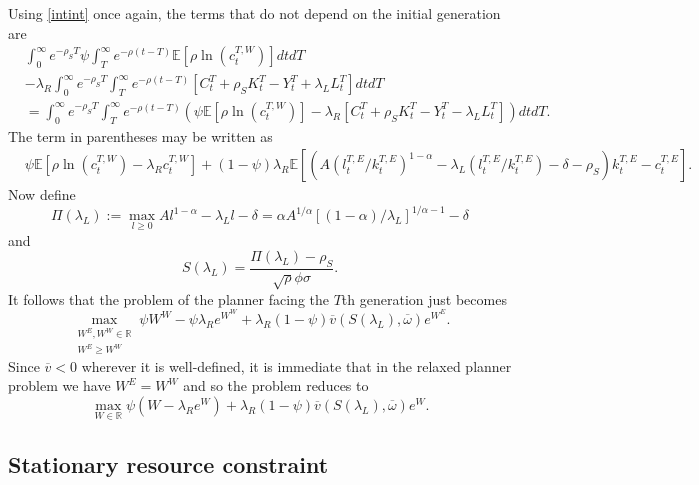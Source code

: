 \documentclass[11pt]{article}
\theoremstyle{plain}
\theoremstyle{definition} %
\begin{document}
Using \eqref{intint} once again, the terms that do not depend on the initial generation are 
\begin{align*}
 & \int_0^{\infty}e^{-\rho_ST} \psi \int_T^{\infty}e^{-\rho (t-T)} \mathbb{E} [\rho \ln(c^{T,W}_t)]dt dT
\\ & - \lambda_R \int_0^{\infty} e^{-\rho_ST}\int_T^{\infty} e^{-\rho (t-T)} [C^T_t + \rho_SK^T_t - Y^T_t + \lambda_LL^T_t]dtdT
\\ & = \int_0^{\infty} e^{-\rho_ST}\int_T^{\infty}e^{-\rho (t-T)} {\left(\psi\mathbb{E} [\rho\ln(c^{T,W}_t)] - \lambda_R[C^T_t + \rho_SK^T_t - Y^T_t - \lambda_LL^T_t]\right)}dt dT .
\end{align*}
The term in parentheses may be written as 
\begin{align*}
 & \psi\mathbb{E} {\left[\rho\ln(c^{T,W}_t) - \lambda_R c^{T,W}_t\right]} + (1-\psi) \lambda_R \mathbb{E}{\left[{\left(A(l^{T,E}_t/k^{T,E}_t)^{1-\alpha} - \lambda_L(l^{T,E}_t/k^{T,E}_t) - \delta - \rho_S\right)}k^{T,E}_t - c^{T,E}_t\right]}.
\end{align*}
Now define 
\begin{equation}
\Pi(\lambda_L) := \max_{l\geq 0} A l^{1-\alpha} - \lambda_Ll - \delta = \alpha A^{1/\alpha} [(1-\alpha)/\lambda_L]^{1/\alpha-1} - \delta
\label{PilambdaL}
\end{equation}
and 
\begin{equation}
S(\lambda_L) = \frac{\Pi(\lambda_L) - \rho_S}{\sqrt{\rho}\phi \sigma}. %
\label{GER}
\end{equation}
It follows that the problem of the planner facing the $T$th generation just becomes 
\begin{equation}
\max_{\substack{W^E, W^W \in \mathbb{R} \\ W^E \geq W^W}} \psi W^W - \psi \lambda_R e^{W^W} + \lambda_R(1-\psi)\overline{v}(S(\lambda_L), \overline{\omega})e^{W^E}. 
\label{Tgen}
\end{equation}
Since $\overline{v}<0$ wherever it is well-defined, it is immediate that in the relaxed planner problem we have $W^E = W^W$ and so the problem reduces to
$$
\max_{W \in \mathbb{R}} \psi (W - \lambda_R e^{W}) + \lambda_R(1-\psi)\overline{v}(S(\lambda_L), \overline{\omega})e^{W}. 
$$

\subsection{Stationary resource constraint} \label{STATapp}
\end{document}
